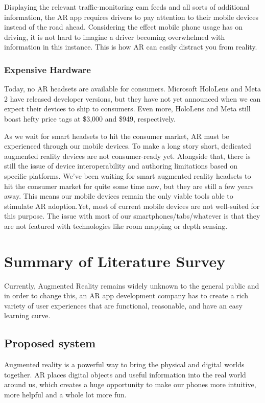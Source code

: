 \documentclass[BTech]{srmuthesis}
\begin{document}
Displaying the relevant traffic-monitoring cam feeds and all sorts of additional information, the AR app requires drivers to pay attention to their mobile devices instead of the road ahead. Considering the effect mobile phone usage has on driving, it is not hard to imagine a driver becoming overwhelmed with information in this instance. This is how AR can easily distract you from reality.
\subsubsection{Expensive Hardware}
Today, no AR headsets are available for consumers. Microsoft HoloLens and Meta 2 have released developer versions, but they have not yet announced when we can expect their devices to ship to consumers. Even more, HoloLens and Meta still boast hefty price tags at \$3,000 and \$949, respectively.

As we wait for smart headsets to hit the consumer market, AR must be experienced through our mobile devices. To make a long story short, dedicated augmented reality devices are not consumer-ready yet. Alongside that, there is still the issue of device interoperability and authoring limitations based on specific platforms. We've been waiting for smart augmented reality headsets to hit the consumer market for quite some time now, but they are still a few years away. This means our mobile devices remain the only viable tools able to stimulate AR adoption.Yet, most of current mobile devices are not well-suited for this purpose. The issue with most of our smartphones/tabs/whatever is that they are not featured with technologies like room mapping or depth sensing.

\section{Summary of Literature Survey}
Currently, Augmented Reality remains widely unknown to the general public and in order to change this, an AR app development company has to create a rich variety of user experiences that are functional, reasonable, and have an easy learning curve.
\subsection{Proposed system}
Augmented reality is a powerful way to bring the physical and digital worlds together. AR places digital objects and useful information into the real world around us, which creates a huge opportunity to make our phones more intuitive, more helpful and a whole lot more fun.
\end{document}
